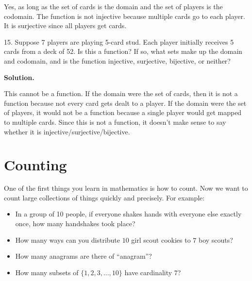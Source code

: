 \documentclass[10pt,]{book}
\theoremstyle{plain}
\theoremstyle{definition}
\theoremstyle{definition}
\theoremstyle{definition}
\numberwithin{equation}{section}
\begin{document}
\begin{exerciselist}
            Yes, as long as the set of cards is the domain and the set of players is the codomain. The function is not injective because multiple cards go to each player. It is surjective since all players get cards.
\item[15.]\hypertarget{exercise-41}{}
            Suppose 7 players are playing 5-card stud. Each player initially receives 5 cards from a deck of 52. Is this a function? If so, what sets make up the domain and codomain, and is the function injective, surjective, bijective, or neither?
\par\smallskip
\par\smallskip
\noindent\textbf{Solution.}\hypertarget{solution-59}{}\quad

            This cannot be a function. If the domain were the set of cards, then it is not a function because not every card gets dealt to a player. If the domain were the set of players, it would not be a function because a single player would get mapped to multiple cards. Since this is not a function, it doesn't make sense to say whether it is injective/surjective/bijective.
\end{exerciselist}
\typeout{************************************************}
\typeout{************************************************}
\chapter[Counting]{Counting}\label{ch_counting}
\typeout{************************************************}
\typeout{************************************************}

One of the first things you learn in mathematics is how to count. Now we want to count large collections of things quickly and precisely. For example:
%
\leavevmode%
\begin{itemize}[label=\textbullet]
\item{}
In a group of 10 people, if everyone shakes hands with everyone else exactly once, how many handshakes took place?
%
\item{}
How many ways can you distribute \(10\) girl scout cookies to \(7\) boy scouts?
%
\item{}
How many anagrams are there of ``anagram''?
%
\item{}
How many subsets of \(\{1,2,3,\ldots, 10\}\) have cardinality \(7\)?
%
\end{itemize}
\par
\end{document}
